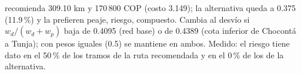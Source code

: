 {recomienda 309.10 km y 170\,800 COP (costo 3.149); la alternativa queda a 0.375 (11.9\,\%) y la prefieren peaje, riesgo, compuesto. Cambia al desvío si $w_d/(w_d+w_p)$ baja de 0.4095 (red base) o de 0.4389 (cota inferior de Chocontá a Tunja); con pesos iguales (0.5) se mantiene en ambos.}
{Medido: el riesgo tiene dato en el 50\,\% de los tramos de la ruta recomendada y en el 0\,\% de los de la alternativa.}
